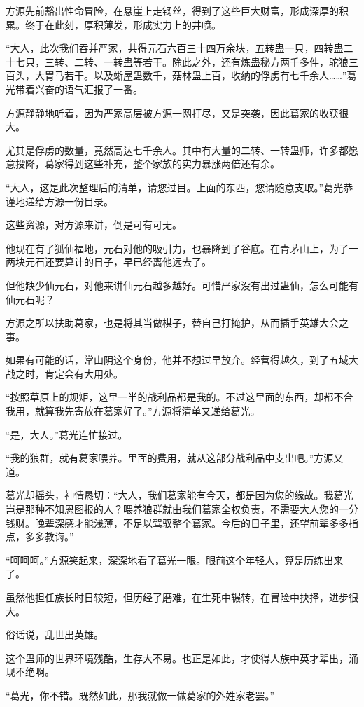\begin{this_body}
方源先前豁出性命冒险，在悬崖上走钢丝，得到了这些巨大财富，形成深厚的积累。终于在此刻，厚积薄发，形成实力上的井喷。

“大人，此次我们吞并严家，共得元石六百三十四万余块，五转蛊一只，四转蛊二十七只，三转、二转、一转蛊等若干。除此之外，还有炼蛊秘方两千多件，驼狼三百头，大胃马若干。以及蜥屋蛊数千，菇林蛊上百，收纳的俘虏有七千余人……”葛光带着兴奋的语气汇报了一番。

方源静静地听着，因为严家高层被方源一网打尽，又是突袭，因此葛家的收获很大。

尤其是俘虏的数量，竟然高达七千余人。其中有大量的二转、一转蛊师，许多都愿意投降，葛家得到这些补充，整个家族的实力暴涨两倍还有余。

“大人，这是此次整理后的清单，请您过目。上面的东西，您请随意支取。”葛光恭谨地递给方源一份目录。

这些资源，对方源来讲，倒是可有可无。

他现在有了狐仙福地，元石对他的吸引力，也暴降到了谷底。在青茅山上，为了一两块元石还要算计的日子，早已经离他远去了。

但他缺少仙元石，对他来讲仙元石越多越好。可惜严家没有出过蛊仙，怎么可能有仙元石呢？

方源之所以扶助葛家，也是将其当做棋子，替自己打掩护，从而插手英雄大会之事。

如果有可能的话，常山阴这个身份，他并不想过早放弃。经营得越久，到了五域大战之时，肯定会有大用处。

“按照草原上的规矩，这里一半的战利品都是我的。不过这里面的东西，却都不合我用，就算我先寄放在葛家好了。”方源将清单又递给葛光。

“是，大人。”葛光连忙接过。

“我的狼群，就有葛家喂养。里面的费用，就从这部分战利品中支出吧。”方源又道。

葛光却摇头，神情恳切：“大人，我们葛家能有今天，都是因为您的缘故。我葛光岂是那种不知恩图报的人？喂养狼群就由我们葛家全权负责，不需要大人您的一分钱财。晚辈深感才能浅薄，不足以驾驭整个葛家。今后的日子里，还望前辈多多指点，多多教诲。”

“呵呵呵。”方源笑起来，深深地看了葛光一眼。眼前这个年轻人，算是历练出来了。

虽然他担任族长时日较短，但历经了磨难，在生死中辗转，在冒险中抉择，进步很大。

俗话说，乱世出英雄。

这个蛊师的世界环境残酷，生存大不易。也正是如此，才使得人族中英才辈出，涌现不绝啊。

“葛光，你不错。既然如此，那我就做一做葛家的外姓家老罢。”


\end{this_body}
